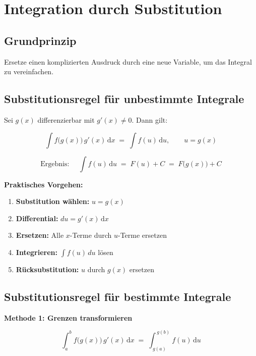 \documentclass[a4paper,11pt,oneside,open=any,parskip=half, DIV=15]{scrreprt}
\begin{document}
\section{Integration durch Substitution}

   \subsection*{Grundprinzip} 

      Ersetze einen komplizierten Ausdruck durch eine neue Variable, um das Integral zu vereinfachen.

   \subsection*{Substitutionsregel für unbestimmte Integrale}

      Sei \(g(x)\) differenzierbar mit \(g'(x) \neq 0\). Dann gilt:
      \begin{importantbox}
      \[
         \int f\bigl(g(x)\bigr)\,g'(x)\,\mathrm{d}x \;=\; \int f(u)\,\mathrm{d}u,
         \qquad u=g(x)
      \]

      \[
         \text{Ergebnis: }\quad \int f(u)\,\mathrm{d}u \;=\; F(u)+C \;=\; F\bigl(g(x)\bigr)+C
      \]
      \end{importantbox}

      \noindent
      \textbf{Praktisches Vorgehen:}
      \begin{enumerate}
         \item \textbf{Substitution wählen:} \(u = g(x)\)
         \item \textbf{Differential:} \(du = g'(x)\,\mathrm{d}x\)
         \item \textbf{Ersetzen:} Alle \(x\)-Terme durch \(u\)-Terme ersetzen
         \item \textbf{Integrieren:} \(\int f(u) \, du\) lösen
         \item \textbf{Rücksubstitution:} \(u\) durch \(g(x)\) ersetzen
      \end{enumerate}

   \subsection*{Substitutionsregel für bestimmte Integrale}

      \textbf{Methode 1: Grenzen transformieren}
      \begin{importantbox}
         \[
            \int_{a}^{b} f\bigl(g(x)\bigr)\,g'(x)\,\mathrm{d}x \;=\;\int_{\,g(a)}^{\,g(b)} f(u)\,\mathrm{d}u 
         \]
      \end{importantbox}
\end{document}
